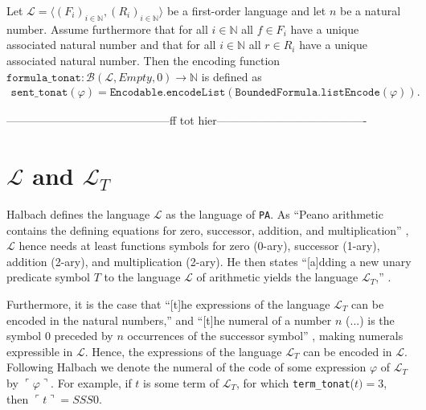 \begin{definition}\label{def:S-To-N}
  \leanok
    Let $\mathcal{L} = \langle (F_i)_{i \in \mathbb{N}}, (R_i)_{i \in \mathbb{N}} \rangle$ be a first-order language and let $n$ be a natural number. Assume furthermore that for all $i \in \mathbb{N}$ all $f \in F_i$ have a unique associated natural number and that for all $i \in \mathbb{N}$ all $r \in R_i$ have a unique associated natural number. Then the encoding function $\texttt{formula\_tonat} : \mathcal{B}(\mathcal{L},Empty,0) \to \mathbb{N}$ is defined as 
    \begin{align*}
        \texttt{sent\_tonat}(\varphi) = \texttt{Encodable.encodeList}(\texttt{BoundedFormula.listEncode}(\varphi)).
    \end{align*}
\end{definition}


--------------------------------------------ff tot hier----------------------------------------


\section{$\mathcal{L}$ and $\mathcal{L}_T$}\label{subsec:lpa-lt}
Halbach defines the language $\mathcal{L}$ as the language of \texttt{PA}. As ``Peano arithmetic contains the defining equations for zero, successor, addition, and multiplication'' \cite[p. 30]{halbach:2011}, $\mathcal{L}$ hence needs at least functions symbols for zero (0-ary), successor (1-ary), addition (2-ary), and multiplication (2-ary). He then states ``[a]dding a new unary predicate symbol $T$ to the language $\mathcal{L}$ of arithmetic yields the language $\mathcal{L}_T$,'' \cite[p. 31]{halbach:2011}.

Furthermore, it is the case that ``[t]he expressions of the language $\mathcal{L}_T$ can be encoded in the natural numbers,'' and ``[t]he numeral of a number $n$ (...) is the symbol 0 preceded by $n$ occurrences of the successor symbol'' \cite[p. 31]{halbach:2011}, making numerals expressible in $\mathcal{L}$. Hence, the expressions of the language $\mathcal{L}_T$ can be encoded in $\mathcal{L}$. Following Halbach we denote the numeral of the code of some expression $\varphi$ of $\mathcal{L}_T$ by $\ulcorner \varphi \urcorner$. For example, if $t$ is some term of $\mathcal{L}_T$, for which \texttt{term\_tonat}($t) = 3$, then $\ulcorner t \urcorner = SSS0$.

